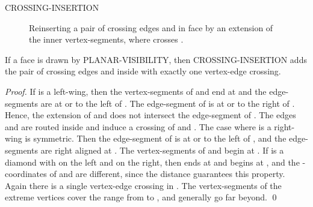 \documentclass[runningheads]{llncs}
\begin{document}
\begin{algorithm}
  \caption{CROSSING-INSERTION}\label{alg:crossing-insertion}

\end{algorithm}






\begin{figure}
  \centering
  \quad\quad
  \caption{Reinserting a pair of crossing edges  and  in face  by an extension
  of the inner vertex-segments, where  crosses  .
  \label{fig:crossinginsertion}}
\end{figure}





\begin{lemma} \label{proofCrossingInsertion}
If a face  is drawn by PLANAR-VISIBILITY, then
CROSSING-INSERTION adds the pair of crossing edges  and
 inside  with exactly one vertex-edge crossing.
\end{lemma}

\begin{proof}
If  is  a left-wing, then the vertex-segments of  and  end
at  and the edge-segments are at or to the left of
. The edge-segment of  is at or to the right
of . Hence, the extension of  and 
does not intersect the edge-segment of . The edges 
and  are routed inside  and induce a crossing of  and
. The case where  is a right-wing is symmetric. Then the
edge-segment of  is at or to the left of , and
the edge-segments  are right aligned at
. The vertex-segments of  and  begin at
. If  is a diamond with  on the left and  on
the right, then  ends at  and 
begins at , and the -coordinates of  and  are
different, since the distance  guarantees this property.
Again there is
 a single
vertex-edge crossing in . The vertex-segments of the extreme
vertices cover the range from   to , and
generally go far beyond. \qed
\end{proof}
\end{document}
